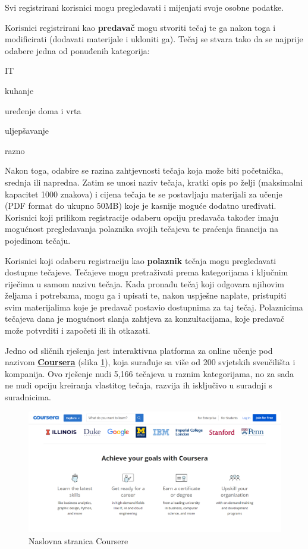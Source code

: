 	Svi registrirani korisnici mogu pregledavati i mijenjati svoje osobne podatke.
	
	Korisnici registrirani kao \textbf{predavač} mogu stvoriti tečaj te ga nakon toga i modificirati (dodavati materijale i ukloniti ga). Tečaj se stvara tako da se najprije odabere jedna od ponuđenih kategorija:
	\begin{packed_item}
		\item IT
		\item kuhanje
		\item uređenje doma i vrta
		\item uljepšavanje
		\item razno
	\end{packed_item}
 Nakon toga, odabire se razina zahtjevnosti tečaja koja može biti početnička, srednja ili napredna. Zatim se unosi naziv tečaja, kratki opis po želji (maksimalni kapacitet 1000 znakova) i cijena tečaja te se postavljaju materijali za učenje (PDF format do ukupno 50MB) koje je kasnije moguće dodatno uređivati. Korisnici koji prilikom registracije odaberu opciju predavača također imaju mogućnost pregledavanja polaznika svojih tečajeva te praćenja financija na pojedinom tečaju. 
	
	Korisnici koji odaberu registraciju kao \textbf{polaznik} tečaja mogu pregledavati dostupne tečajeve. Tečajeve mogu pretraživati prema kategorijama i ključnim riječima u samom nazivu tečaja. Kada pronađu tečaj koji odgovara njihovim željama i potrebama, mogu ga i upisati te, nakon uspješne naplate, pristupiti svim materijalima koje je predavač postavio dostupnima za taj tečaj. Polaznicima tečajeva dana je mogućnost slanja zahtjeva za konzultacijama, koje predavač može potvrditi i započeti ili ih otkazati.
	
	
	Jedno od sličnih rješenja jest interaktivna platforma za online učenje pod nazivom \href{https://www.coursera.org/}{\textbf{Coursera}} (slika \ref{fig:Coursera}), koja surađuje sa više od 200 svjetskih sveučilišta i kompanija. Ovo rješenje nudi 5,166 tečajeva u raznim kategorijama, no za sada ne nudi opciju kreiranja vlastitog tečaja, razvija ih isključivo u suradnji s suradnicima.
	
	\begin{figure}[H]
		\includegraphics[scale=0.4]{slike/Coursera.PNG}
		\centering
		\caption{Naslovna stranica Coursere}
		\label{fig:Coursera}
	\end{figure}

